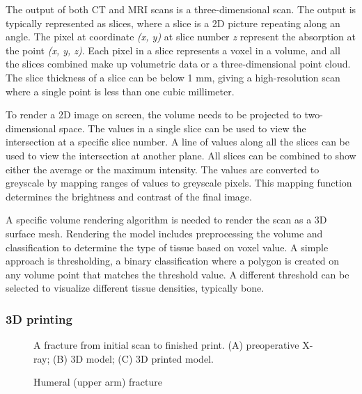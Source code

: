 \documentclass[a4paper]{report}
\begin{document}
The output of both CT and MRI scans is a three-dimensional scan. The output is typically represented as slices, where a slice is a 2D picture repeating along an angle. The pixel at coordinate \emph{(x, y)} at slice number \emph{z} represent the absorption at the point \emph{(x, y, z)}\cite{chougule_conversions_2013}.
Each pixel in a slice represents a voxel in a volume, and all the slices combined make up volumetric data or a three-dimensional point cloud\cite{chougule_conversions_2013}.
The slice thickness of a slice can be below 1 mm, giving a high-resolution scan where a single point is less than one cubic millimeter\cite{hamblen_outline_2010}.

To render a 2D image on screen, the volume needs to be projected to two-dimensional space. The values in a single slice can be used to view the intersection at a specific slice number. A line of values along all the slices can be used to view the intersection at another plane.
All slices can be combined to show either the average or the maximum intensity\cite{fishman_volume_2006}.
The values are converted to greyscale by mapping ranges of values to greyscale pixels. This mapping function determines the brightness and contrast of the final image.

A specific volume rendering algorithm is needed to render the scan as a 3D surface mesh. Rendering the model includes preprocessing the volume and classification to determine the type of tissue based on voxel value. A simple approach is thresholding, a binary classification where a polygon is created on any volume point that matches the threshold value. A different threshold can be selected to visualize different tissue densities, typically bone\cite{fishman_volume_2006}.
\subsubsection{ 3D printing }

\begin{figure}[h!]
    \centering
	\hfill
  \caption{Humeral (upper arm) fracture}
  \small
    A fracture from initial scan to finished print. (A) preoperative X-ray; (B) 3D model; (C) 3D printed model.
~\cite{mishra_virtual_2019}
\end{figure}
\end{document}
